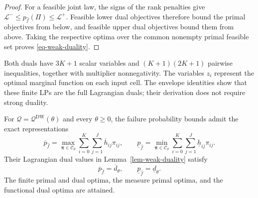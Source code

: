 \begin{proof}
  For a feasible joint law, the signs of the rank penalties give $\mathcal L^-\le p_{\hat f}(\Pi)\le\mathcal L^+$. Feasible lower dual objectives therefore bound the primal objectives from below, and feasible upper dual objectives bound them from above. Taking the respective optima over the common nonempty primal feasible set proves \eqref{eq-weak-duality}.
\end{proof}

Both duals have $3K+1$ scalar variables and $(K+1)(2K+1)$ pairwise inequalities, together with multiplier nonnegativity. The variables $z_i$ represent the optimal marginal function on each input cell. The envelope identities show that these finite LPs are the full Lagrangian duals; their derivation does not require strong duality.

\begin{theorem}
  \label{thm-finite-dual-reformulations}
  For $\mathcal Q=\mathcal Q^{\mathrm{DW}}(\theta)$ and every $\theta\ge0$, the failure probability bounds admit the exact representations
  \begin{equation}
    \overline p_{\hat f}
      =\max_{\bm\pi\in\mathcal C_\theta}\sum_{i=0}^{K}\sum_{j=1}^{J}\overline h_{ij}\pi_{ij},
    \qquad
    \underline p_{\hat f}
      =\min_{\bm\pi\in\mathcal C_\theta}\sum_{i=0}^{K}\sum_{j=1}^{J}\underline h_{ij}\pi_{ij}.
    \label{eq-finite-primal-values}
  \end{equation}
  Their Lagrangian dual values in Lemma~\ref{lem-weak-duality} satisfy
  \begin{equation}
    \overline p_{\hat f}=\overline d_\theta,
    \qquad
    \underline p_{\hat f}=\underline d_\theta.
    \label{eq-strong-duality}
  \end{equation}
  The finite primal and dual optima, the measure primal optima, and the functional dual optima are attained.
\end{theorem}
